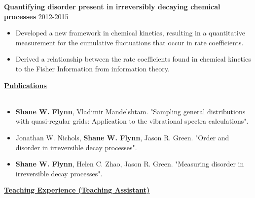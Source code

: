 \documentclass[letterpaper]{article}
\begin{document}
\textbf{Quantifying disorder present in irreversibly decaying chemical
processes}
\hfill 2012-2015
\begin{itemize}
    \item Developed a new framework in chemical kinetics, resulting in
    a quantitative measurement for the cumulative fluctuations that occur in rate
    coefficients.
    \vspace{-0.05in}
    \item Derived a relationship between the rate coefficients found in chemical
    kinetics to the Fisher Information from information theory.
\end{itemize}
{\large \textbf{\underline{Publications}}}\\
\vspace{-0.3in}\\
\begin{itemize}
    \item \textbf{Shane W. Flynn}, Vladimir Mandelshtam.
    "Sampling general distributions with quasi-regular grids: Application to the
    vibrational spectra calculations".
    \vspace{-0.05in}
    \item Jonathan W. Nichols, \textbf{Shane W. Flynn}, Jason R.
    Green. "Order and disorder in irreversible decay processes".
    \vspace{-0.05in}
    \item \textbf{Shane W. Flynn}, Helen C. Zhao, Jason R. Green.
    "Measuring disorder in irreversible decay processes".
\end{itemize}
{\large \textbf{\underline{Teaching Experience (Teaching Assistant)}}}\\
\vspace{-0.3in}\\
\end{document}
